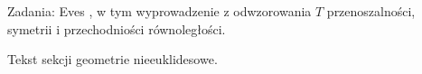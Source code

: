 Zadania: Eves \cite[s. 314]{eves1_1972}, w tym wyprowadzenie z odwzorowania $T$ przenoszalności, symetrii i przechodniości równoległości. %

















































Tekst sekcji geometrie nieeuklidesowe. %


